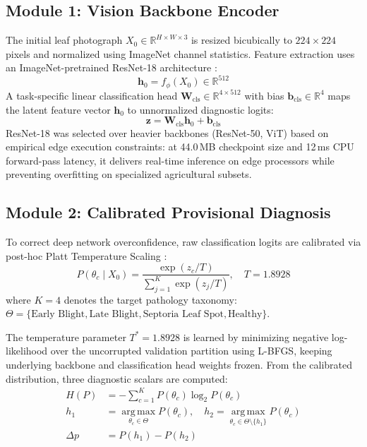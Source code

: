 \documentclass[conference]{IEEEtran}
\begin{document}
\subsection{Module 1: Vision Backbone Encoder}
The initial leaf photograph $X_0 \in \mathbb{R}^{H \times W \times 3}$ is resized bicubically to $224 \times 224$ pixels and normalized using ImageNet channel statistics. Feature extraction uses an ImageNet-pretrained ResNet-18 architecture \cite{he2016}:
\begin{equation}
    \mathbf{h}_0 = f_{\phi}(X_0) \in \mathbb{R}^{512}
\end{equation}
A task-specific linear classification head $\mathbf{W}_{\text{cls}} \in \mathbb{R}^{4 \times 512}$ with bias $\mathbf{b}_{\text{cls}} \in \mathbb{R}^4$ maps the latent feature vector $\mathbf{h}_0$ to unnormalized diagnostic logits:
\begin{equation}
    \mathbf{z} = \mathbf{W}_{\text{cls}} \mathbf{h}_0 + \mathbf{b}_{\text{cls}}
\end{equation}
ResNet-18 was selected over heavier backbones (ResNet-50, ViT) based on empirical edge execution constraints: at 44.0\,MB checkpoint size and 12\,ms CPU forward-pass latency, it delivers real-time inference on edge processors while preventing overfitting on specialized agricultural subsets.

\subsection{Module 2: Calibrated Provisional Diagnosis}
To correct deep network overconfidence, raw classification logits are calibrated via post-hoc Platt Temperature Scaling \cite{guo2017}:
\begin{equation}
    P(\theta_c \mid X_0) = \frac{\exp(z_c / T)}{\sum_{j=1}^K \exp(z_j / T)}, \quad T = 1.8928
\end{equation}
where $K = 4$ denotes the target pathology taxonomy: $\Theta = \{\text{Early Blight}, \text{Late Blight}, \text{Septoria Leaf Spot}, \text{Healthy}\}$.

The temperature parameter $T^* = 1.8928$ is learned by minimizing negative log-likelihood over the uncorrupted validation partition using L-BFGS, keeping underlying backbone and classification head weights frozen. From the calibrated distribution, three diagnostic scalars are computed:
\begin{align}
    H(P) &= -\sum_{c=1}^K P(\theta_c) \log_2 P(\theta_c) \\
    h_1 &= \operatorname*{arg\,max}_{\theta_c \in \Theta} P(\theta_c), \quad h_2 = \operatorname*{arg\,max}_{\theta_c \in \Theta \setminus \{h_1\}} P(\theta_c) \\
    \Delta p &= P(h_1) - P(h_2)
\end{align}
\end{document}

